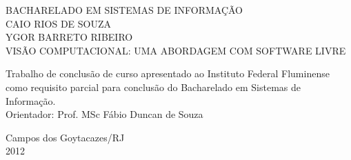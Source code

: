 \begin{titlepage}
 \begin{figure}[ht]
 \centering
 \end{figure}
 \begin{center}
   {\large BACHARELADO EM SISTEMAS DE INFORMAÇÃO} \\ [3.5cm]
   {\large CAIO RIOS DE SOUZA} \\
   {\large YGOR BARRETO RIBEIRO} \\ [4cm]
   {\large VISÃO COMPUTACIONAL: UMA ABORDAGEM COM SOFTWARE LIVRE} \\ [2cm]
   \hspace{.45\textwidth} %
   \begin{minipage}{0.5\textwidth}
   \begin{espacosimples}
        Trabalho de conclusão de curso apresentado ao Instituto Federal Fluminense como requisito parcial para conclusão do Bacharelado em Sistemas de Informação.\\[1.5cm]
        Orientador: Prof. MSc Fábio Duncan de Souza
    \end{espacosimples}
    \end{minipage}
   \vfill
   {\large Campos dos Goytacazes/RJ} \\
   {\large 2012}
 \end{center}
\end{titlepage}
